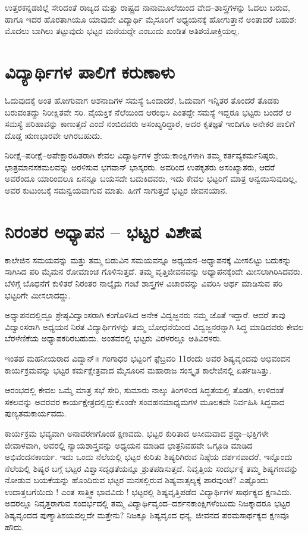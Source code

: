 {ಉತ್ತರಕನ್ನಡಜಿಲ್ಲೆ ಸೇರಿದಂತೆ ರಾಜ್ಯದ ಮತ್ತು ರಾಷ್ಟ್ರದ ನಾನಾಮೂಲೆಯಿಂದ ವೇದ–ಶಾಸ್ತ್ರಗಳನ್ನು ಓದಲು ಬರುವ, ಹಾಗೂ ಇದರ ಹೊರತಾಗಿಯೂ ಯಾವುದೇ ವಿದ್ಯಾರ್ಥಿ ಮೈಸೂರಿಗೆ ಅಧ್ಯಯನಕ್ಕೆ ಹೋಗುತ್ತಾನೆ ಅಂತಾದರೆ ಬಹುಶ: ಮೊದಲು ಬಾಗಿಲು ತಟ್ಟುವುದು  ಭಟ್ಟರ ಮನೆಯದ್ದೇ ಎಂಬುದು ಖಂಡಿತ ಅತಿಶಯೋಕ್ತಿಯಲ್ಲ. 

\section*{ವಿದ್ಯಾರ್ಥಿಗಳ ಪಾಲಿಗೆ ಕರುಣಾಳು}

ಓದುವುದಕ್ಕೆ ಅಂತ ಹೋಗುವಾಗ ಅಶನಾದಿಗಳ ಸಮಸ್ಯೆ ಒಂದಾದರೆ, ಓದುವಾಗ ಇನ್ನಿತರ ತೊಂದರೆ ತೊಡಕು ಬರುವಂತದ್ದು ನಿರೀಕ್ಷಿತವೇ ಸರಿ. ವೈಯಕ್ತಿಕ ನೆಲೆಯಿಂದ ಆರಂಭಿಸಿ ಎಂತದ್ದೇ ಸಮಸ್ಯೆ ಇದ್ದರೂ ಭಟ್ಟರು ಬಂದರೆ ಆ ಸಮಸ್ಯೆ ಪರಿಹಾವನ್ನು ಕಾಣುತ್ತದೆ ಎಂದೆ ನಂಬಿದವರು ಅಸಂಖ್ಯರಿದ್ದಾರೆ, ಅದರ ಕೃತಜ್ಞತೆ ಇಂದಿಗೂ ಅನೇಕರ ಪಾಲಿಗೆ ದೊಡ್ಡ ಋಣಭಾರವೇ ಆಗಿರಬಹುದು. 

ನಿರೀಕ್ಷೆ–ಪರೀಕ್ಷೆ–ಅಪೇಕ್ಷಾರಹಿತರಾಗಿ ಕೇವಲ ವಿದ್ಯಾರ್ಥಿಗಳ ಶ್ರೇಯ:ಕಾಂಕ್ಷಿಗಳಾಗಿ ತಮ್ಮ ಕರ್ತವ್ಯಕರ್ಮನಿಷ್ಠರು, ಛಾತ್ರಮಾನಸಕಮಲವನ್ನು ಅರಳಿಸುವ ಭಗವಾನ್ ಭಾಸ್ಕರರು. ಅವರಿಂದ ಉಪಕೃತರು ಅಸಂಖ್ಯಾತರು, ಆದರೆ ಅವರೆಂದೂ ಯಾರಿಂದಲೂ ಏನನ್ನೂ ಬಯಸದೇ ಬದುಕಿದವರು, ಇದು ಕೇವಲ ಭಟ್ಟರಿಗೆ ಮಾತ್ರ ಅನ್ವಯಿಸುವುದಿಲ್ಲ, ಅವರ ಕುಟುಂಬಕ್ಕೆ ಸಮನ್ವಯವಾಗುವ ಮಾತು. ಹೀಗೆ ಸಾಗುತ್ತದೆ  ಭಟ್ಟರ ಜೀವನಯಾನ.

\section*{ನಿರಂತರ ಅಧ್ಯಾಪನ – ಭಟ್ಟರ ವಿಶೇಷ}

ಕಾಲೇಜಿನ ಸಮಯವನ್ನು ಮತ್ತು ತಮ್ಮ ಬಿಡುವಿನ ಸಮಯವನ್ನೂ ಅಧ್ಯಯನ–ಅಧ್ಯಾಪನಕ್ಕೆ ಮೀಸಲಿಟ್ಟು ಬದುಕನ್ನು ಸಾಗಿಸಿದ ಪರಿ ಮೈಮನ ರೋಮಾಂಚ ಗೊಳಿಸುತ್ತದೆ. ತಮ್ಮ ವೃತ್ತಿಜೀವನವನ್ನು ಅಧ್ಯಾಪನಕ್ಕೆಂದೇ ಮೀಸಲಾಗಿರಿಸಿದವರು. ಬೆಳಿಗ್ಗೆ ಬೊಧನೆಗೆ ಕುಳಿತರೆ ನಿರಂತರ ನಾಲ್ಕೈದು ಗಂಟೆ ಶಾಸ್ತ್ರಗಳ ವಿಚಾರವನ್ನು ವಿವರಿಸಿ ಅರ್ಥ ಮಾಡಿಸುವ ಪರಿ ಭಟ್ಟರಿಗೇ ಮೀಸಲಾದದ್ದು.

ಅಧ್ಯಾಪನದಲ್ಲಿದ್ದೂ ಶ್ರೇಷ್ಠವಿದ್ವಾಂಸರಾಗಿ  ಕಂಗೊಳಿಸಿದ ಅನೇಕ ವಿದ್ವಜ್ಜನರು ನಮ್ಮ ಜೊತೆ ಇದ್ದಾರೆ. ಆದರೆ ತಾವು ವಿದ್ವಾಂಸರಾಗಿ ಅಧ್ಯಯನ ನಿರತ ವಿದ್ಯಾರ್ಥಿಗಳನ್ನು ತಮ್ಮ ಬೋಧನೆಯಿಂದ ವಿದ್ವಜ್ಜನರನ್ನಾಗಿ ಸಿದ್ಧ ಮಾಡಿದವರು ಕೇವಲ ಬೆರಳೆಣಿಕೆಯ ಅಧ್ಯಾಪಕರಿರಬಹುದು. ಅಂತವರಲ್ಲಿ ಭಟ್ಟರು ವಿರಳರಲ್ಲೂ ಅತಿವಿರಳರು.

ಇಂತಹ ಮಹನೀಯರಾದ ವಿದ್ವಾನ್॥ ಗಂಗಾಧರ ಭಟ್ಟರಿಗೆ ಫ಼ೆಬ್ರವರಿ 11ರಂದು ಅವರ ಶಿಷ್ಯವೃಂದವು  ಅಭಿವಂದನ ಕಾರ್ಯಕ್ರಮವನ್ನು ಭಟ್ಟರ ಕರ್ಮಕ್ಷೇತ್ರವಾದ ಮೈಸೂರಿನ ಮಹಾರಾಜ ಸಂಸ್ಕೃತ ಕಾಲೇಜಿನಲ್ಲಿ ಏರ್ಪಡಿಸಿತ್ತು. 

ಆರಂಭದಲ್ಲಿ ಕೇವಲ ಒಮ್ಮೆ ಮಾತ್ರ ಸಭೆ ಸೇರಿ, ಸುಮಾರು ನಾಲ್ಕು ತಿಂಗಳಿಂದ ಸಿದ್ಧತೆಯಲ್ಲಿ ತೊಡಗಿ, ಉಳಿದಂತೆ ಸಕಲವನ್ನು ಅವರವರ ಕಾರ್ಯಕ್ಷೇತ್ರದಲ್ಲಿದ್ದುಕೊಂಡೇ ಸಂವಹನಮಾಧ್ಯಮಗಳ ಮೂಲಕವೇ ನಿರ್ವಹಿಸಿ ಸಿದ್ಧವಾದ ಪುಣ್ಯತಮಕಾರ್ಯವದು. 

ಕಾರ್ಯಕ್ರಮ ಭವ್ಯವಾಗಿ ಅನಾವರಣಗೊಂಡ ಕ್ಷಣವದು. ಭಟ್ಟರ ಕುರಿತಾದ ಅಸೀಮವಾದ ಶ್ರದ್ಧಾ–ಭಕ್ತಿಗಳೇ ಜೀವಾಳವಾಗಿ, ಅವರಲ್ಲಿ ನ್ಯಾಯಶಾಸ್ತ್ರವನ್ನು ಅಧ್ಯಯನ ಮಾಡಿದ ಛಾತ್ರನಿವಹವೇ ಒಗ್ಗೂಡಿ ಮಾಡಿದ ಅಭಿವಂದನಕಾರ್ಯ.    ಇದು ಒಂದು ನೆಲೆಯಲ್ಲಿ ಭಟ್ಟರ ಕುರಿತು ಶಿಷ್ಯರಿಗಿರುವ ನಿಷ್ಠೆಯ ದರ್ಶನವಾದರೆ, ಇನ್ನೊಂದು ನೆಲೆಯಲ್ಲಿ  ಶಿಷ್ಯರ ಬಗ್ಗೆ ಭಟ್ಟರ ವಿಶ್ವಾಸದೃಢತೆಯನ್ನೂ ಶ್ರುತಪಡಿಸುತ್ತದೆ. ನಿವೃತ್ತಿಯ ಸಂದರ್ಭಕ್ಕೆ  ತಮ್ಮ ಶಿಷ್ಯಗಣವನ್ನು ನೋಡುವ ಬಯಕೆಯನ್ನು ಹೊಂದಿರುವ ಭಟ್ಟರ ಮನಸಲ್ಲಿರುವ ಶಿಷ್ಯವಾತ್ಸಲ್ಯಕ್ಕೆ ಪಾರವುಂಟೆ? ಎಷ್ಟೊಂದು ಉದಾತ್ತಬಗೆಯಿದು ! ಎಂತ ಸಾತ್ತ್ವಿಕ ಭಾವವಿದು ! ಭಟ್ಟರಲ್ಲಿ ಶಿಷ್ಯವೃತ್ತಿಪಡೆದ ವಿದ್ಯಾರ್ಥಿಗಳ ಸಾರ್ಥಕ್ಯದ ಕ್ಷಣವಿದು. ಅದರಲ್ಲೂ ನಿವೃತ್ತರಾಗುವ ಸಂದರ್ಭದಲ್ಲಿ ತಮ್ಮ ವಿದ್ಯಾರ್ಥಿವೃಂದ–ದರ್ಶನಕಾಂಕ್ಷಿಗಳೆಂಬುದು ನಿಜಕ್ಕಾದರೂ ಭಟ್ಟರ ಶಿಷ್ಯವೃಂದದ ಪುಣ್ಯಾತಿಶಯವಲ್ಲದೇ ಮತ್ತೇನು? ನಿಜಕ್ಕೂ ಶಿಷ್ಯವೃಂದ ಧನ್ಯ. ಜೀವನದ ಪರಮಸಾರ್ಥಕ್ಯದ ಕ್ಷಣವೂ ಹೌದು. 

}
